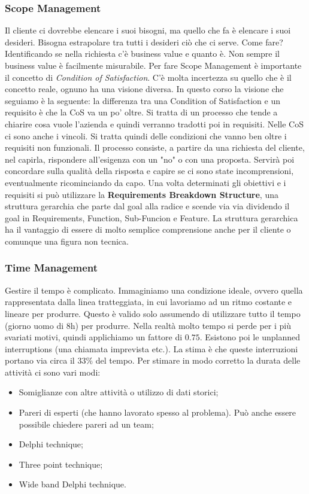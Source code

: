 \subsubsection{Scope Management}
Il cliente ci dovrebbe elencare i suoi bisogni, ma quello che fa è elencare i suoi desideri. Bisogna estrapolare tra tutti i desideri ciò che ci serve. Come fare? Identificando se nella richiesta c'è business value e quanto è. Non sempre il business value è facilmente misurabile.\newline
Per fare Scope Management è importante il concetto di \textit{Condition of Satisfaction}. C'è molta incertezza su quello che è il concetto reale, ognuno ha una visione diversa. In questo corso la visione che seguiamo è la seguente: la differenza tra una Condition of Satisfaction e un requisito è che la CoS va un po' oltre. Si tratta di un processo che tende a chiarire cosa vuole l'azienda e quindi verranno tradotti poi in requisiti. Nelle CoS ci sono anche i vincoli. Si tratta quindi delle condizioni che vanno ben oltre i requisiti non funzionali. Il processo consiste, a partire da una richiesta del cliente, nel capirla, rispondere all'esigenza con un "no" o con una proposta. Servirà poi concordare sulla qualità della risposta e capire se ci sono state incomprensioni, eventualmente ricominciando da capo.
\noindent Una volta determinati gli obiettivi e i requisiti si può utilizzare la \textbf{Requirements Breakdown Structure}, una struttura gerarchia che parte dal goal alla radice e scende via via dividendo il goal in Requirements, Function, Sub-Funcion e Feature. La struttura gerarchica ha il vantaggio di essere di molto semplice comprensione anche per il cliente o comunque una figura non tecnica.
\subsubsection{Time Management}
Gestire il tempo è complicato. Immaginiamo una condizione ideale, ovvero quella rappresentata dalla linea tratteggiata, in cui lavoriamo ad un ritmo costante e lineare per produrre. Questo è valido solo assumendo di utilizzare tutto il tempo (giorno uomo di 8h) per produrre. Nella realtà molto tempo si perde per i più svariati motivi, quindi applichiamo un fattore di $0.75$. Esistono poi le unplanned interruptions (una chiamata imprevista etc.). La stima è che queste interruzioni portano via circa il $33\%$ del tempo.
Per stimare in modo corretto la durata delle attività ci sono vari modi:
\begin{itemize}
	\item Somiglianze con altre attività o utilizzo di dati storici;
	\item Pareri di esperti (che hanno lavorato spesso al problema). Può anche essere possibile chiedere pareri ad un team;
	\item Delphi technique;
	\item Three point technique;
	\item Wide band Delphi technique.
\end{itemize}
